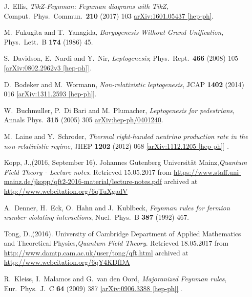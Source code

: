\begin{thebibliography}{56}
J.~Ellis,
\textit{TikZ-Feynman: Feynman diagrams with TikZ},
Comput.\ Phys.\ Commun.\  {\textbf {210}} (2017) 103
\href{https://arxiv.org/abs/1601.05437}{arXiv:1601.05437 [hep-ph]}.

M.~Fukugita and T.~Yanagida,
\textit{Baryogenesis Without Grand Unification},
Phys.\ Lett.\ B {\textbf{174}} (1986) 45.

S.~Davidson, E.~Nardi and Y.~Nir,
\textit{Leptogenesis};
Phys.\ Rept.\  {\textbf{466}} (2008) 105
\href{https://arxiv.org/abs/0802.2962v3}{[arXiv:0802.2962v3 [hep-ph]]}.

D.~Bodeker and M.~Wormann,
\textit{Non-relativistic leptogenesis},
JCAP {\textbf{1402}} (2014) 016
\href{https://arxiv.org/abs/1311.2593}{[arXiv:1311.2593 [hep-ph]]}.

W.~Buchmuller, P.~Di Bari and M.~Plumacher,
\textit{Leptogenesis for pedestrians},
Annals Phys.\  {\textbf{315}} (2005) 305
\href{https://arxiv.org/abs/hep-ph/0401240v1}{arXiv:hep-ph/0401240}.

M.~Laine and Y.~Schroder,
\textit{Thermal right-handed neutrino production rate in the non-relativistic regime},
JHEP {\textbf{1202}} (2012) 068
\href{https://arxiv.org/abs/1112.1205v2}{[arXiv:1112.1205 [hep-ph]]}
.

Kopp, J.,(2016, September 16). Johannes Gutenberg Universität Mainz,\textit{Quantum Field Theory - Lecture notes}.  Retrieved
15.05.2017 from \href{https://www.staff.uni-mainz.de/jkopp/qft2-2016-material/lecture-notes.pdf}{https://www.staff.uni-mainz.de/jkopp/qft2-2016-material/lecture-notes.pdf} archived at
\href{http://www.webcitation.org/6qTuXgadV}{http://www.webcitation.org/6qTuXgadV}

A.~Denner, H.~Eck, O.~Hahn and J.~Kublbeck,
\textit{Feynman rules for fermion number violating interactions},
Nucl.\ Phys.\ B {\textbf{387}} (1992) 467.

Tong, D.,(2016). University of Cambridge Department of Applied Mathematics and Theoretical Physics,\textit{Quantum Field Theory}.  Retrieved
18.05.2017 from \href{http://www.damtp.cam.ac.uk/user/tong/qft.html}{http://www.damtp.cam.ac.uk/user/tong/qft.html} archived at
\href{http://www.webcitation.org/6qY4KDfDA}{http://www.webcitation.org/6qY4KDfDA}


R.~Kleiss, I.~Malamos and G.~van den Oord,
\textit{Majoranized Feynman rules},
Eur.\ Phys.\ J.\ C {\textbf{64}} (2009) 387
\href{https://arxiv.org/abs/0906.3388v2}{[arXiv:0906.3388 [hep-ph]]}
.



\end{thebibliography}
